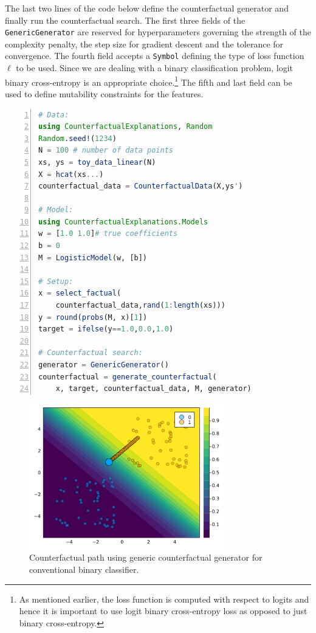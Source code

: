\documentclass[
  letterpaper,
  DIV=11,
  numbers=noendperiod]{scrartcl}
\begin{document}
The last two lines of the code below define the counterfactual generator
and finally run the counterfactual search. The first three fields of the
\texttt{GenericGenerator} are reserved for hyperparameters governing the
strength of the complexity penalty, the step size for gradient descent
and the tolerance for convergence. The fourth field accepts a
\texttt{Symbol} defining the type of loss function \(\ell\) to be used.
Since we are dealing with a binary classification problem, logit binary
cross-entropy is an appropriate choice.\footnote{As mentioned earlier,
  the loss function is computed with respect to logits and hence it is
  important to use logit binary cross-entropy loss as opposed to just
  binary cross-entropy.} The fifth and last field can be used to define
mutability constraints for the features.

\begin{lstlisting}[language=Julia, escapechar=@, numbers=left] 
# Data:
using CounterfactualExplanations, Random
Random.seed!(1234)
N = 100 # number of data points
xs, ys = toy_data_linear(N)
X = hcat(xs...)
counterfactual_data = CounterfactualData(X,ys')

# Model:
using CounterfactualExplanations.Models 
w = [1.0 1.0]# true coefficients
b = 0
M = LogisticModel(w, [b])

# Setup:
x = select_factual(
    counterfactual_data,rand(1:length(xs)))
y = round(probs(M, x)[1])
target = ifelse(y==1.0,0.0,1.0) 

# Counterfactual search:
generator = GenericGenerator()
counterfactual = generate_counterfactual(
    x, target, counterfactual_data, M, generator)
\end{lstlisting}

\begin{figure}

{\centering \includegraphics[width=3.33333in,height=2.5in]{www/ce_binary.png}

}

\caption{\label{fig-binary}Counterfactual path using generic
counterfactual generator for conventional binary classifier.}

\end{figure}
\end{document}
